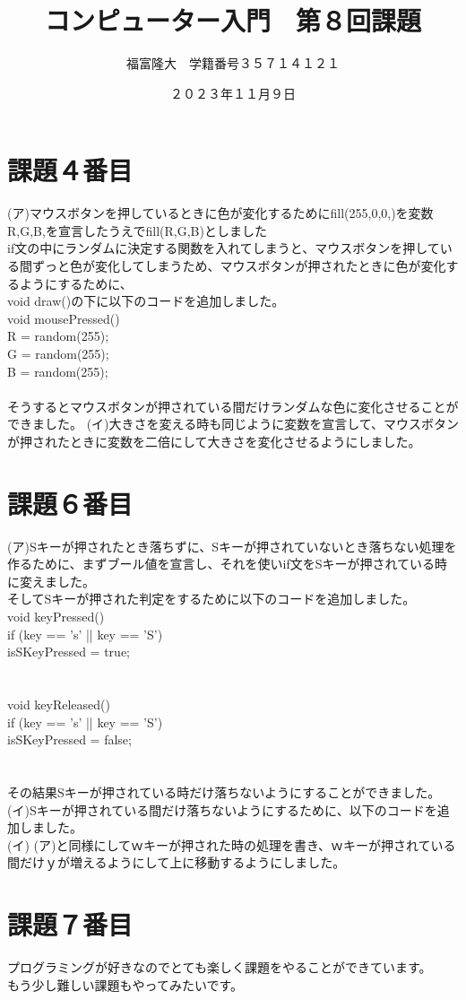 \documentclass{jsarticle}
\title{コンピューター入門　第８回課題}
\author{福富隆大　学籍番号３５７１４１２１}
\date{２０２３年１１月９日}
\begin{document}
\maketitle
\section{課題４番目}
(ア)マウスボタンを押しているときに色が変化するためにfill(255,0,0,)を変数R,G,B,を宣言したうえでfill(R,G,B)としました\\
if文の中にランダムに決定する関数を入れてしまうと、マウスボタンを押している間ずっと色が変化してしまうため、マウスボタンが押されたときに色が変化するようにするために、\\
void draw(){}の下に以下のコードを追加しました。\\
void mousePressed(){\\
  R = random(255);\\
  G = random(255);\\
  B = random(255);\\
}\\
そうするとマウスボタンが押されている間だけランダムな色に変化させることができました。
(イ)大きさを変える時も同じように変数を宣言して、マウスボタンが押されたときに変数を二倍にして大きさを変化させるようにしました。\\
\section{課題６番目}
(ア)Sキーが押されたとき落ちずに、Sキーが押されていないとき落ちない処理を作るために、まずブール値を宣言し、それを使いif文をSキーが押されている時に変えました。\\
そしてSキーが押された判定をするために以下のコードを追加しました。\\
void keyPressed() {\\
  if (key == 's' || key == 'S') {\\
    isSKeyPressed = true;\\
  }\\
}\\
void keyReleased() {\\
  if (key == 's' || key == 'S') {\\
    isSKeyPressed = false;\\
  }\\
}\\
その結果Sキーが押されている時だけ落ちないようにすることができました。\\
(イ)Sキーが押されている間だけ落ちないようにするために、以下のコードを追加しました。\\
(イ)
(ア)と同様にしてｗキーが押された時の処理を書き、ｗキーが押されている間だけｙが増えるようにして上に移動するようにしました。\\
\section{課題７番目}
プログラミングが好きなのでとても楽しく課題をやることができています。\\
もう少し難しい課題もやってみたいです。\\
\end{document}
